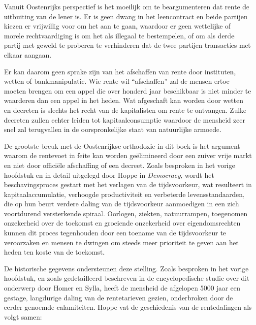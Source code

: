 Vanuit Oostenrijks perspectief is het moeilijk om te beargumenteren dat rente de uitbuiting van de lener is. Er is geen dwang in het leencontract en beide partijen kiezen er vrijwillig voor om het aan te gaan, waardoor er geen wettelijke of morele rechtvaardiging is om het als illegaal te bestempelen, of om als derde partij met geweld te proberen te verhinderen dat de twee partijen transacties met elkaar aangaan.

\begin{blockquotebox}
Er kan daarom geen sprake zijn van het afschaffen van rente door instituten, wetten of bankmanipulatie. Wie rente wil ``afschaffen'' zal de mensen ertoe moeten brengen om een appel die over honderd jaar beschikbaar is niet minder te waarderen dan een appel in het heden. Wat afgeschaft kan worden door wetten en decreten is slechts het recht van de kapitalisten om rente te ontvangen. Zulke decreten zullen echter leiden tot kapitaalconsumptie waardoor de mensheid zeer snel zal terugvallen in de oorspronkelijke staat van natuurlijke armoede.\footnotemark
\end{blockquotebox}
\autocite{162}

De grootste breuk met de Oostenrijkse orthodoxie in dit boek is het argument waarom de rentevoet in feite kan worden geëlimineerd door een zuiver vrije markt en niet door officiële afschaffing of een decreet. Zoals besproken in het vorige hoofdstuk en in detail uitgelegd door Hoppe in \emph{Democracy}, wordt het beschavingsproces gestart met het verlagen van de tijdsvoorkeur, wat resulteert in kapitaalaccumulatie, verhoogde productiviteit en verbeterde levensstandaarden, die op hun beurt verdere daling van de tijdsvoorkeur aanmoedigen in een zich voortdurend versterkende spiraal. Oorlogen, ziekten, natuurrampen, toegenomen onzekerheid over de toekomst en groeiende onzekerheid over eigendomsrechten kunnen dit proces tegenhouden door een toename van de tijdsvoorkeur te veroorzaken en mensen te dwingen om steeds meer prioriteit te geven aan het heden ten koste van de toekomst.

De historische gegevens ondersteunen deze stelling. Zoals besproken in het vorige hoofdstuk, en zoals gedetailleerd beschreven in de encyclopedische studie over dit onderwerp door Homer en Sylla, heeft de mensheid de afgelopen 5000 jaar een gestage, langdurige daling van de rentetarieven gezien, onderbroken door de eerder genoemde calamiteiten.\autocite{163} Hoppe vat de geschiedenis van de rentedalingen als volgt samen:


